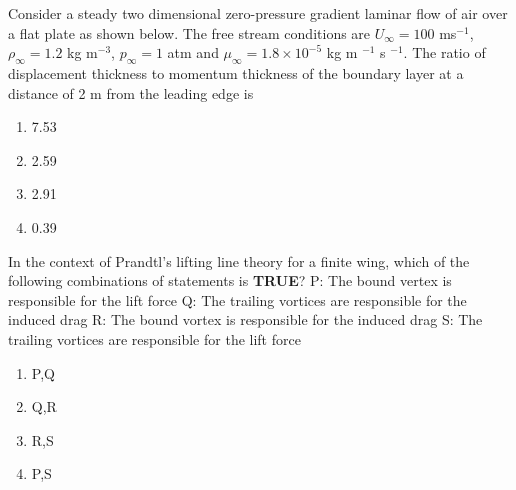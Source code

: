 \item Consider a steady two dimensional zero-pressure gradient laminar flow of air over a flat plate as shown below. The free stream conditions are $U_{\infty} = 100$ ms$^{-1}$, $\rho_{\infty} = 1.2$ kg m$^{-3}$, $p_{\infty} = 1$ atm and $\mu_{\infty} = 1.8 \times 10^{-5}$ kg m $^{-1}$ s $^{-1}$. The ratio of displacement thickness to momentum thickness of the boundary layer at a distance of 2 m from the leading edge is
\centering
{}
\begin{multicols}{2}
    \begin{enumerate}
        \item 7.53
        \item 2.59
        \item 2.91
        \item 0.39
    \end{enumerate}
\end{multicols}

\item In the context of Prandtl's lifting line theory for a finite wing, which of the following combinations of statements is \textbf{TRUE}?
P: The bound vertex is responsible for the lift force
Q: The trailing vortices are responsible for the induced drag
R: The bound vortex is responsible for the induced drag
S: The trailing vortices are responsible for the lift force
\begin{multicols}{2}
    \begin{enumerate}
        \item P,Q  
        \item Q,R
        \item R,S
        \item P,S
    \end{enumerate}
\end{multicols}


